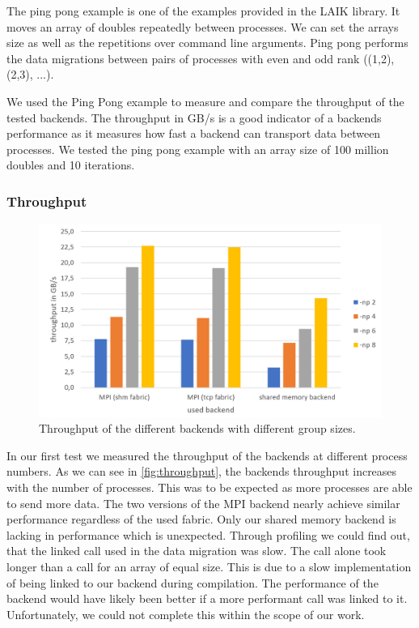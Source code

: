 The ping pong example is one of the examples provided in the LAIK library.
It moves an array of doubles repeatedly between processes.
We can set the arrays size as well as the repetitions over command line arguments.
Ping pong performs the data migrations between pairs of processes with even and odd rank ((1,2), (2,3), ...).

We used the Ping Pong example to measure and compare the throughput of the tested backends.
The throughput in GB/s is a good indicator of a backends performance as it measures how fast a backend can transport data between processes.
We tested the ping pong example with an array size of 100 million doubles and 10 iterations.

\subsubsection{Throughput}
\begin{figure}[h]
	\centering
	\includegraphics[width=0.75\columnwidth]{figures/throughput.png}
	\caption{Throughput of the different backends with different group sizes.}
	\label{fig:throughput}
\end{figure}

In our first test we measured the throughput of the backends at different process numbers. 
As we can see in \autoref{fig:throughput}, the backends throughput increases with the number of processes.
This was to be expected as more processes are able to send more data.
The two versions of the MPI backend nearly achieve similar performance regardless of the used fabric.
Only our shared memory backend is lacking in performance which is unexpected.
Through profiling we could find out, that the linked  call used in the data migration was slow.
The call alone took longer than a  call for an array of equal size.
This is due to a slow implementation of  being linked to our backend during compilation.
The performance of the backend would have likely been better if a more performant  call was linked to it.
Unfortunately, we could not complete this within the scope of our work.

